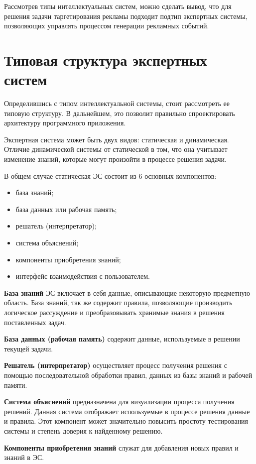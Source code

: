 Рассмотрев типы интеллектуальных систем, можно сделать вывод, что для решения задачи таргетирования рекламы подходит подтип экспертных системы, позволяющих управлять процессом генерации рекламных событий.

\section{Типовая структура экспертных систем}

Определившись с типом интеллектуальной системы, стоит рассмотреть ее типовую структуру. В дальнейшем, это позволит правильно спроектировать архитектуру программного приложения.

Экспертная система может быть двух видов: статическая и динамическая. Отличие динамической системы от статической в том, что она учитывает изменение знаний, которые могут произойти в процессе решения задачи.

В общем случае статическая ЭС состоит из 6 основных компонентов:
\begin{itemize}
	\item база знаний;
	\item база данных или рабочая память;
	\item решатель (интерпретатор);
	\item система объяснений; 
	\item компоненты приобретения знаний;
	\item интерфейс взаимодействия с пользователем. 
\end{itemize}

\textbf{База знаний} ЭС включает в себя данные, описывающие некоторую предметную область. База знаний, так же содержит правила, позволяющие производить логическое рассуждение и преобразовывать хранимые знания в решения поставленных задач.

\textbf{База данных (рабочая память)} содержит данные, используемые в решении текущей задачи.

\textbf{Решатель (интерпретатор)} осуществляет процесс получения решения с помощью последовательной обработки правил, данных из базы знаний и рабочей памяти.

\textbf{Система объяснений} предназначена для визуализации процесса получения решений. Данная система отображает используемые в процессе решения данные и правила. Этот компонент может значительно повысить простоту тестирования системы и степень доверия к найденному решению.

\textbf{Компоненты приобретения знаний} служат для добавления новых правил и знаний в ЭС. 
    
